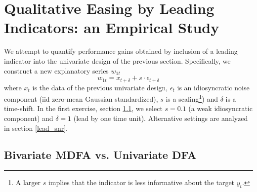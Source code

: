 \documentclass[a4paper]{book}
\begin{document}
\section{Qualitative Easing by Leading Indicators: an Empirical Study}\label{leading_ind}

We attempt to quantify performance gains obtained by inclusion of a leading indicator into the univariate design of the previous section. Specifically, we construct a new explanatory  series $w_{1t}$ 
\begin{equation}\label{def_led_i}
w_{1t}=x_{t+\delta}+s\cdot\epsilon_{t+\delta}
\end{equation}
where $x_t$ is the data of the previous univariate design, $\epsilon_t$ is an idiosyncratic noise component (iid zero-mean Gaussian standardized), $s$ is a scaling\footnote{A larger $s$ implies that the indicator is less informative about the target $y_t$.}) and $\delta$ is a time-shift. 
In the first exercise, section \ref{bimdfaudfa}, we select $s=0.1$ (a weak idiosyncratic component) and $\delta=1$ (lead by one time unit). Alternative settings are analyzed in section \ref{lead_snr}.

\subsection{Bivariate MDFA vs. Univariate DFA}\label{bimdfaudfa}
\end{document}

